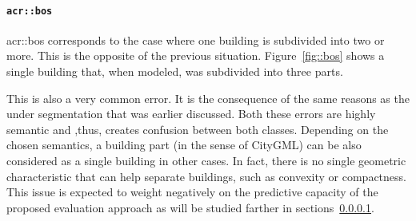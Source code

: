             \paragraph{\texttt{\acrlong*{acr::bos}}}
                \gls{acr::bos} corresponds to the case where one building is subdivided into two or more.
                This is the opposite of the previous situation.
                Figure~\ref{fig::bos} shows a single building that, when modeled, was subdivided into three parts.\\

                \begin{figure}[H]
                    \centering
                \end{figure}

                This is also a very common error.
                It is the consequence of the same reasons as the under segmentation that was earlier discussed.
                Both these errors are highly semantic and ,thus, creates confusion between both classes.
                Depending on the chosen semantics, a building part (in the sense of CityGML) can be also considered as a single building in other cases.
                In fact, there is no single geometric characteristic that can help separate buildings, such as convexity or compactness.
                This issue is expected to weight negatively on the predictive capacity of the proposed evaluation approach as will be studied farther in sections~\ref{}.

